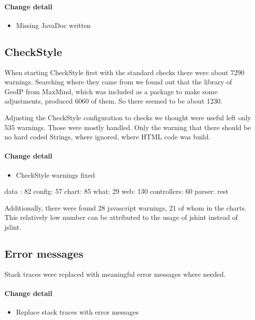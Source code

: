 \paragraph{Change detail}
\begin{itemize}
  \item Missing JavaDoc written
\end{itemize}

\pagebreak[4]
\subsection{CheckStyle}\label{cs} %
When starting CheckStyle first with the standard checks there were about 7290 warnings.
Searching where they came from we found out that the library of GeoIP from MaxMind, 
which was included as a package to make some adjustments, produced 6060 of them. So there seemed to be about
1230.

Adjusting the CheckStyle configuration to checks we thought were useful left only 535 warnings.
Those were mostly handled. Only the warning that there should be no hard coded Strings, where
ignored, where HTML code was build.

\paragraph{Change detail}
\begin{itemize}
  \item CheckStyle warnings fixed
\end{itemize}
data : 82
config: 57
chart: 85
what: 29
web: 130
controllers: 60 
parser: rest

Additionally, there were found 28 javascript warnings, 21 of whom in the charts.
This relatively low number can be attributed to the usage of jshint instead of jslint.

\subsection{Error messages}
Stack traces were replaced with meaningful error messages where needed.
\paragraph{Change detail}
\begin{itemize}
  \item Replace stack traces with error messages
\end{itemize}

 
